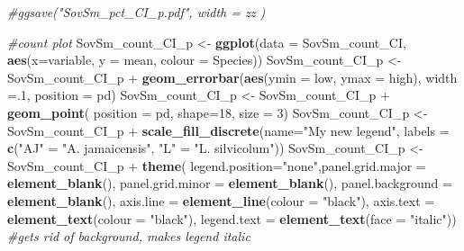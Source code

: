 \documentclass[]{article}
\newenvironment{Shaded}{\begin{snugshade}}{\end{snugshade}}
\newcommand{\KeywordTok}[1]{\textcolor[rgb]{0.13,0.29,0.53}{\textbf{{#1}}}}
\newcommand{\DataTypeTok}[1]{\textcolor[rgb]{0.13,0.29,0.53}{{#1}}}
\newcommand{\DecValTok}[1]{\textcolor[rgb]{0.00,0.00,0.81}{{#1}}}
\newcommand{\StringTok}[1]{\textcolor[rgb]{0.31,0.60,0.02}{{#1}}}
\newcommand{\CommentTok}[1]{\textcolor[rgb]{0.56,0.35,0.01}{\textit{{#1}}}}
\newcommand{\NormalTok}[1]{{#1}}
\begin{document}
\begin{Shaded}
\begin{Highlighting}[]
\CommentTok{#ggsave("SovSm_pct_CI_p.pdf", width = zz  )}

\CommentTok{#count plot}
\NormalTok{SovSm_count_CI_p <-}\StringTok{ }\KeywordTok{ggplot}\NormalTok{(}\DataTypeTok{data =} \NormalTok{SovSm_count_CI, }\KeywordTok{aes}\NormalTok{(}\DataTypeTok{x=}\NormalTok{variable, }\DataTypeTok{y =} \NormalTok{mean, }\DataTypeTok{colour =} \NormalTok{Species))}
\NormalTok{SovSm_count_CI_p <-}\StringTok{ }\NormalTok{SovSm_count_CI_p +}\StringTok{ }\KeywordTok{geom_errorbar}\NormalTok{(}\KeywordTok{aes}\NormalTok{(}\DataTypeTok{ymin =} \NormalTok{low, }\DataTypeTok{ymax =} \NormalTok{high), }\DataTypeTok{width =}\NormalTok{.}\DecValTok{1}\NormalTok{, }\DataTypeTok{position =} \NormalTok{pd)}
\NormalTok{SovSm_count_CI_p <-}\StringTok{ }\NormalTok{SovSm_count_CI_p +}\StringTok{ }\KeywordTok{geom_point}\NormalTok{( }\DataTypeTok{position =} \NormalTok{pd, }\DataTypeTok{shape=}\DecValTok{18}\NormalTok{, }\DataTypeTok{size =} \DecValTok{3}\NormalTok{)}
\NormalTok{SovSm_count_CI_p <-}\StringTok{ }\NormalTok{SovSm_count_CI_p +}\StringTok{ }\KeywordTok{scale_fill_discrete}\NormalTok{(}\DataTypeTok{name=}\StringTok{"My new legend"}\NormalTok{, }\DataTypeTok{labels =} \KeywordTok{c}\NormalTok{(}\StringTok{"AJ"} \NormalTok{=}\StringTok{ "A. jamaicensis"}\NormalTok{, }\StringTok{"L"} \NormalTok{=}\StringTok{ "L. silvicolum"}\NormalTok{)) }
\NormalTok{SovSm_count_CI_p <-}\StringTok{ }\NormalTok{SovSm_count_CI_p +}\StringTok{  }\KeywordTok{theme}\NormalTok{( }\DataTypeTok{legend.position=}\StringTok{"none"}\NormalTok{,}\DataTypeTok{panel.grid.major =} \KeywordTok{element_blank}\NormalTok{(), }\DataTypeTok{panel.grid.minor =} \KeywordTok{element_blank}\NormalTok{(),}
\DataTypeTok{panel.background =} \KeywordTok{element_blank}\NormalTok{(), }\DataTypeTok{axis.line =} \KeywordTok{element_line}\NormalTok{(}\DataTypeTok{colour =} \StringTok{"black"}\NormalTok{), }\DataTypeTok{axis.text =} \KeywordTok{element_text}\NormalTok{(}\DataTypeTok{colour =} \StringTok{"black"}\NormalTok{), }\DataTypeTok{legend.text =} \KeywordTok{element_text}\NormalTok{(}\DataTypeTok{face =} \StringTok{"italic"}\NormalTok{))  }\CommentTok{#gets rid of background, makes legend italic}


\end{Highlighting}
\end{Shaded}
\end{document}
